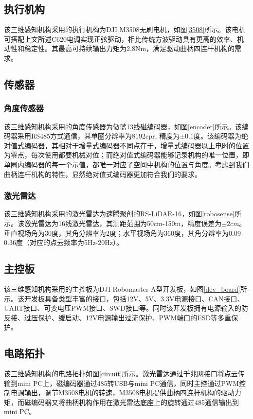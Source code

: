 \subsection{执行机构}
该三维感知机构采用的执行机构为DJI M3508无刷电机，如图\ref{3508}所示。该电机可搭配上文所述C620电调实现正弦驱动，相比传统方波驱动具有更高的效率、机动性和稳定性。其最高可持续输出力矩为2.8Nm，满足驱动曲柄四连杆机构的需求。
\subsection{传感器}

\subsubsection{角度传感器}
该三维感知机构采用的角度传感器为傲蓝13线磁编码器，如图\ref{encoder}所示。该编码器采用RS485方式通信，其单圈分辨率为8192cpr, 精度为$\pm 0.1$度。该编码器为绝对值式编码器，其相对于增量式编码器不同点在于，增量式编码器以上电时的位置为零点，每次使用都要机械对位；而绝对值式编码器能够记录机构的唯一位置，即单圈内编码器的每一个示值，都唯一对应了空间中机构的位置与角度。考虑到我们曲柄连杆机构的特性，显然绝对值式编码器更加符合我们的要求。

\subsubsection{激光雷达}
该三维感知机构采用的激光雷达为速腾聚创的RS-LiDAR-16，如图\ref{robosense}所示。该激光雷达为16线激光雷达，其测距范围为50cm-150m，精度误差为$\pm 2cm$。垂直视场角为30度，其角分辨率为2度；水平视场角为360度，其角分辨率为0.09-0.36度（对应的点云频率为5Hz-20Hz）。

\subsection{主控板}
该三维感知机构采用的主控板为DJI Robomaster A型开发板，如图\ref{dev_board}所示。该开发板具备类型丰富的接口，包括12V、5V、3.3V电源接口、CAN接口、UART接口、可变电压PWM接口、SWD接口等。同时该开发板拥有电源输入的防反接、过压保护、缓启动、12V电源输出过流保护、PWM端口的ESD等多重保护。

\subsection{电路拓扑}
该三维感知机构的电路拓扑如图\ref{circuit}所示。激光雷达通过千兆网接口将点云传输到mini PC上，磁编码器通过485转USB与mini PC通信，同时主控通过PWM控制电调输出，调节M3508电机的转速，M3508电机提供曲柄四连杆机构的驱动力矩，而磁编码器又将曲柄机构作用在激光雷达底座上的旋转通过485通信输出到mini PC。

